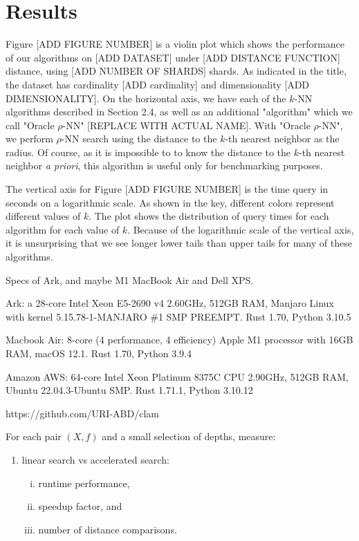 \section{Results}
\label{sec:results}


Figure [ADD FIGURE NUMBER] is a violin plot which shows the performance of our algorithms
on [ADD DATASET] under [ADD DISTANCE FUNCTION] distance, using [ADD NUMBER OF SHARDS] shards.
As indicated in the title, the dataset has cardinality [ADD cardinality] and dimensionality [ADD DIMENSIONALITY].
On the horizontal axis, we have each of the $k$-NN algorithms described in Section 2.4, as well as  
an additional "algorithm" which we call "Oracle $\rho$-NN" [REPLACE WITH ACTUAL NAME].  With "Oracle $\rho$-NN", we perform $\rho$-NN search using the 
distance to the $k$-th nearest neighbor as the radius. Of course, as it is impossible to
to know the distance to the $k$-th nearest neighbor \emph{a priori}, this algorithm 
is useful only for benchmarking purposes.

The vertical axis for Figure [ADD FIGURE NUMBER] is the time query in seconds on a logarithmic scale. 
As shown in the key, different colors represent different values of $k$. 
The plot shows the distribution of query times for each algorithm for each value of $k$. 
Because of the logarithmic scale of the vertical axis, it is unsurprising that we 
see longer lower tails than upper tails for many of these algorithms. 

Specs of Ark, and maybe M1 MacBook Air and Dell XPS.

Ark: a 28-core Intel Xeon E5-2690 v4 2.60GHz, 512GB RAM, Manjaro Linux with kernel 5.15.78-1-MANJARO \#1 SMP PREEMPT. Rust 1.70, Python 3.10.5

Macbook Air: 8-core (4 performance, 4 efficiency) Apple M1 processor with 16GB RAM, macOS 12.1. Rust 1.70, Python 3.9.4

Amazon AWS: 64-core Intel Xeon Platinum 8375C CPU 2.90GHz, 512GB RAM, Ubuntu 22.04.3-Ubuntu SMP. Rust 1.71.1, Python 3.10.12

https://github.com/URI-ABD/clam

For each pair $(X, f)$ and a small selection of depths, measure:
\begin{enumerate}[1.]
    \item linear search vs accelerated search:
    \begin{enumerate}[i.]
        \item runtime performance,
        \item speedup factor, and
        \item number of distance comparisons.
    \end{enumerate}
\end{enumerate}

